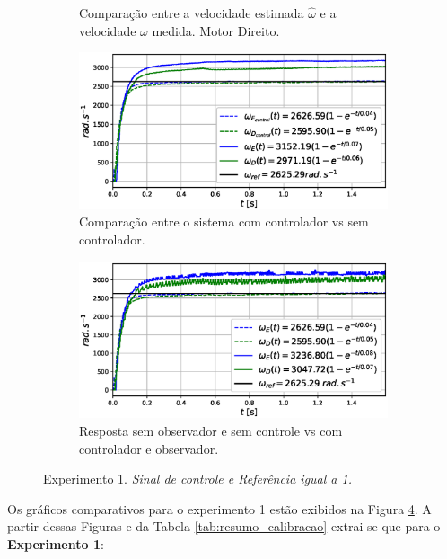 \begin{figure}[H]
\begin{subfigure}{.5\textwidth}
    \caption{Comparação entre a velocidade estimada $\hat{\omega}$ e a velocidade $\omega$ medida. Motor Direito.}
    \label{fig:exp01:filtragem_direito}
    \end{subfigure}
    \hfill
    \begin{subfigure}{.5\textwidth}
    \centering
    \includegraphics[width=\textwidth]{figuras/resultados/exp01/controlador_vs_sem_controlador100.eps}
    \caption{Comparação entre o sistema com controlador vs sem controlador.}
    \label{fig:exp01:controle}
    \end{subfigure}
    \hfill
    \begin{subfigure}{.5\textwidth}
    \centering
    \includegraphics[width=\textwidth]{figuras/resultados/exp01/antes_vs_depois100.eps}
    \caption{Resposta sem observador e sem controle vs com controlador e observador.}
    \label{fig:exp01:antes_vs_depois}
    \end{subfigure}
    
    \caption{Experimento 1. \emph{Sinal de controle e Referência igual a 1.}}
    \label{fig:exp01_100}
\end{figure}


Os gráficos comparativos para o experimento 1 estão exibidos na Figura \ref{fig:exp01_100}. A partir dessas Figuras e da Tabela \ref{tab:resumo_calibracao} extrai-se que para o \textbf{Experimento 1}:


